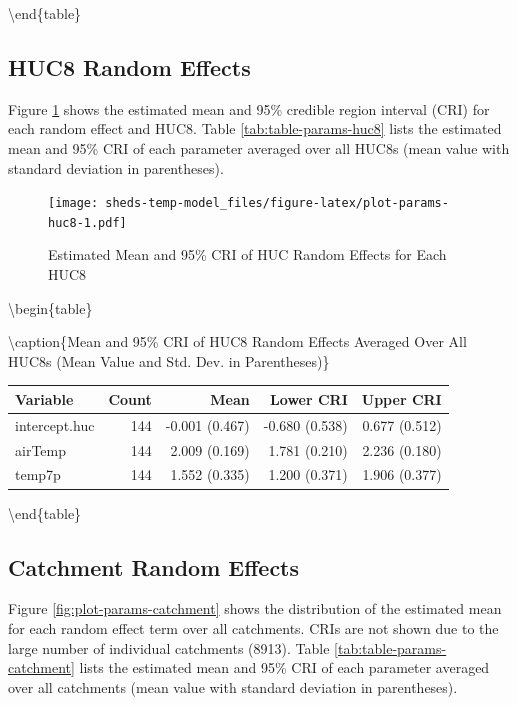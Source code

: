 \documentclass[
]{book}
\begin{document}
\textbackslash end\{table\}

\subsection{HUC8 Random Effects}\label{huc8-random-effects}

Figure \ref{fig:plot-params-huc8} shows the estimated mean and 95\% credible region interval (CRI) for each random effect and HUC8. Table \ref{tab:table-params-huc8} lists the estimated mean and 95\% CRI of each parameter averaged over all HUC8s (mean value with standard deviation in parentheses).

\begin{figure}
\centering
\texttt{[image: sheds-temp-model\_files/figure-latex/plot-params-huc8-1.pdf]}
\caption{\label{fig:plot-params-huc8}Estimated Mean and 95\% CRI of HUC Random Effects for Each HUC8}
\end{figure}

\textbackslash begin\{table\}

\textbackslash caption\{\label{tab:table-params-huc8}Mean and 95\% CRI of HUC8 Random Effects Averaged Over All HUC8s (Mean Value and Std. Dev. in Parentheses)\}
\centering

\begin{tabular}[t]{l|r|r|r|r}
\hline
Variable & Count & Mean & Lower CRI & Upper CRI\\
\hline
intercept.huc & 144 & -0.001 (0.467) & -0.680 (0.538) & 0.677 (0.512)\\
\hline
airTemp & 144 & 2.009 (0.169) & 1.781 (0.210) & 2.236 (0.180)\\
\hline
temp7p & 144 & 1.552 (0.335) & 1.200 (0.371) & 1.906 (0.377)\\
\hline
\end{tabular}

\textbackslash end\{table\}

\subsection{Catchment Random Effects}\label{catchment-random-effects-1}

Figure \ref{fig:plot-params-catchment} shows the distribution of the estimated mean for each random effect term over all catchments. CRIs are not shown due to the large number of individual catchments (8913). Table \ref{tab:table-params-catchment} lists the estimated mean and 95\% CRI of each parameter averaged over all catchments (mean value with standard deviation in parentheses).
\end{document}

